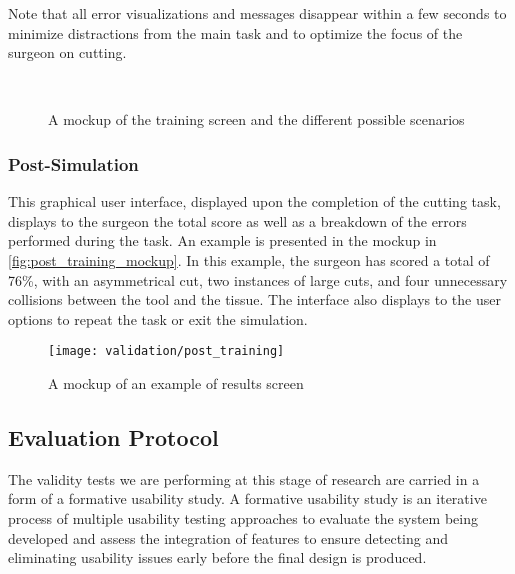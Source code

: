 Note that all error visualizations and messages disappear within a few seconds to minimize distractions from the main task and to optimize the focus of the surgeon on cutting.
\begin{figure}
  \centering%
  \hfill%
  \\
  \hfill%
  \caption{A mockup of the training screen and the different possible scenarios}\label{fig:training_mockup}
\end{figure}

\subsubsection{Post-Simulation}
This graphical user interface, displayed upon the completion of the cutting task, displays to the surgeon the total score as well as a breakdown of the errors performed during the task. An example is presented in the mockup in \autoref{fig:post_training_mockup}. In this example, the surgeon has scored a total of 76\%, with an asymmetrical cut, two instances of large cuts, and four unnecessary collisions between the tool and the tissue. The interface also displays to the user options to repeat the task or exit the simulation.
\begin{figure}
  \centering%
  \texttt{[image: validation/post\_training]}
  \caption{A mockup of an example of results screen}\label{fig:post_training_mockup}
\end{figure}

\subsection{Evaluation Protocol}
The validity tests we are performing at this stage of research are carried in a form of a formative usability study. A formative usability study is an iterative process of multiple usability testing approaches to evaluate the system being developed and assess the integration of features to ensure detecting and eliminating usability issues early before the final design is produced.

